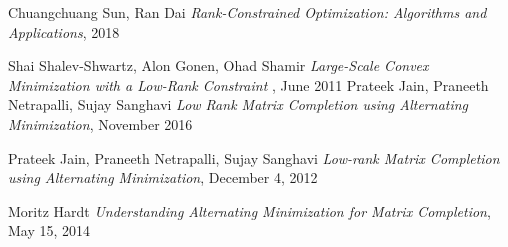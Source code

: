 \documentclass[oneside,final,14pt]{extreport} %
\begin{document}
\begin{thebibliography}{00}
	 Chuangchuang Sun, Ran Dai
	\emph{Rank-Constrained Optimization: Algorithms and Applications}, 2018

	 Shai Shalev-Shwartz, Alon Gonen, Ohad Shamir
	 \emph{Large-Scale Convex Minimization with a Low-Rank Constraint
}, June 2011
	 Prateek Jain, Praneeth Netrapalli, Sujay Sanghavi
        \emph{Low Rank Matrix Completion using Alternating Minimization}, November 2016

	 Prateek Jain, Praneeth Netrapalli, Sujay Sanghavi
        \emph{ Low-rank Matrix Completion using Alternating Minimization}, December 4, 2012

	 Moritz Hardt
        \emph{Understanding Alternating Minimization for Matrix Completion}, May 15, 2014

\end{thebibliography}
\end{document}
